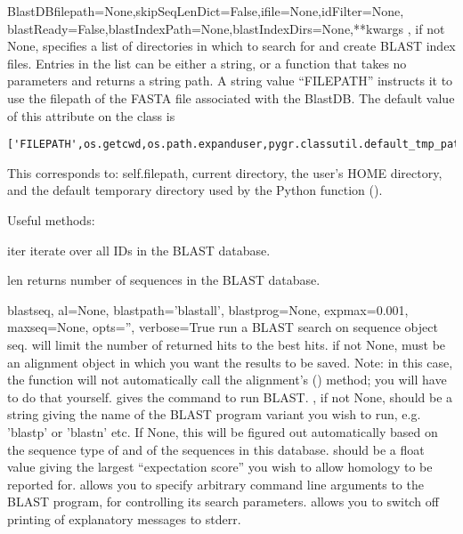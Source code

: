 \documentclass{howto}
\begin{document}
\begin{funcdesc}{BlastDB}{filepath=None,skipSeqLenDict=False,ifile=None,idFilter=None,
                 blastReady=False,blastIndexPath=None,blastIndexDirs=None,**kwargs}
  , if not None, specifies a list of directories in which
  to search for and create BLAST index files.  Entries in the list can be
  either a string, or a function that takes no parameters and returns 
  a string path.  A string value ``FILEPATH'' instructs it to use the 
  filepath of the FASTA file associated with the BlastDB.
  The default value of this attribute on the  class is 
\begin{verbatim}
['FILEPATH',os.getcwd,os.path.expanduser,pygr.classutil.default_tmp_path]
\end{verbatim}
This corresponds to: self.filepath, current directory, the user's HOME
directory, and the default temporary directory used by the Python 
function ().
\end{funcdesc}

Useful methods:

\begin{funcdesc}{iter}{}
  iterate over all IDs in the BLAST database.
\end{funcdesc}

\begin{funcdesc}{len}{}
  returns number of sequences in the BLAST database.
\end{funcdesc}

\begin{funcdesc}{blast}{seq, al=None, blastpath='blastall', blastprog=None, expmax=0.001,
maxseq=None, opts='', verbose=True}
  run a BLAST search on sequence object seq.
   will limit the number of returned hits to the best  hits. 
   if not None, must be an alignment object in which you want the results
  to be saved.  Note: in this case, the  function will not automatically
  call the alignment's () method; you will have to do that yourself.
   gives the command to run BLAST.
  , if not None, should be a string giving the name of the BLAST
  program variant you wish to run, e.g. 'blastp' or 'blastn' etc.  If None,
  this will be figured out automatically based on the sequence type of 
  and of the sequences in this database.
   should be a float value giving the largest ``expectation score''
  you wish to allow homology to be reported for.
   allows you to specify arbitrary command line arguments to the BLAST
  program, for controlling its search parameters.
   allows you to switch off printing of explanatory messages to 
  stderr.
\end{funcdesc}
\end{document}
